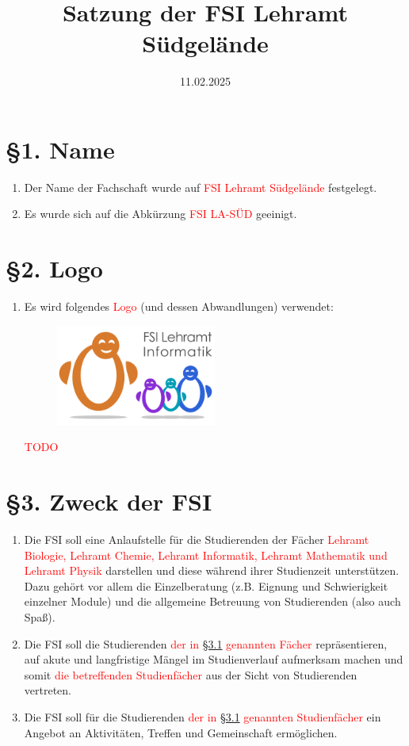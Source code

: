 \documentclass[a4paper,12pt]{article}
\title{Satzung der FSI Lehramt Südgelände}
\date{11.02.2025}
\newcommand{\red}[1]{\textcolor{red}{#1}}
\begin{document}
\maketitle

\section*{§1. Name}

\begin{enumerate}
    \item Der Name der Fachschaft wurde auf \red{FSI Lehramt Südgelände} festgelegt.
    \item Es wurde sich auf die Abkürzung \red{FSI LA-SÜD} geeinigt.
\end{enumerate}

\section*{§2. Logo}

\begin{enumerate}
	\item
		Es wird folgendes \red{Logo} (und dessen Abwandlungen) verwendet:
		\begin{figure}[h]
			\includegraphics[width=0.5\textwidth]{img/logo.png}
		\end{figure}
		
		\red{TODO}
\end{enumerate}

\section*{§3. Zweck der FSI}

\begin{enumerate}
	\item
		\label{3.1}
		Die FSI soll eine Anlaufstelle für die Studierenden der Fächer \red{Lehramt Biologie, Lehramt Chemie, Lehramt Informatik, Lehramt Mathematik und Lehramt Physik}
		darstellen und diese während ihrer Studienzeit
		unterstützen. Dazu gehört vor allem die Einzelberatung (z.B.
		Eignung und Schwierigkeit einzelner Module) und die allgemeine
		Betreuung von Studierenden (also auch Spaß).
	\item
		Die FSI soll die Studierenden \red{der in \hyperref[3.1]{§3.1} genannten Fächer}
		repräsentieren, auf akute und langfristige Mängel im
		Studienverlauf aufmerksam machen und somit \red{die betreffenden Studienfächer} aus der Sicht von Studierenden vertreten.
	\item
		Die FSI soll für die Studierenden \red{der in \hyperref[3.1]{§3.1} genannten Studienfächer}
		ein Angebot an Aktivitäten, Treffen und Gemeinschaft
		ermöglichen.
\end{enumerate}
\end{document}
